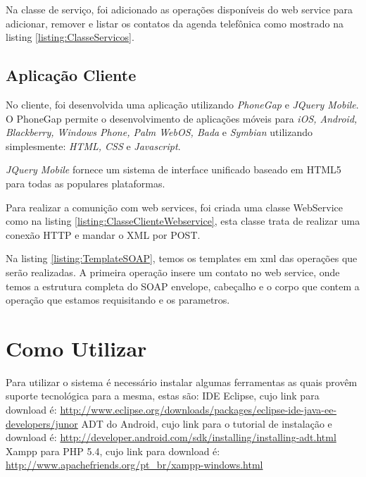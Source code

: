 \documentclass{acm_proc_article-sp}
\begin{document}
	
	
	Na classe de serviço, foi adicionado as operações disponíveis do web service para adicionar, remover e listar os contatos da agenda telefônica como mostrado na listing \ref{listing:ClasseServicos}.
	
	
	
	\subsection{Aplicação Cliente}
	
	No cliente, foi desenvolvida uma aplicação utilizando \emph{PhoneGap} e \emph{JQuery Mobile}. O PhoneGap permite o desenvolvimento de aplicações móveis para \emph{iOS, Android, Blackberry, Windows Phone, Palm WebOS, Bada} e \emph{Symbian} utilizando simplesmente: \emph{HTML, CSS} e \emph{Javascript}\cite{PHONEGAPSITE}.
	
	\emph{JQuery Mobile} fornece um sistema de interface unificado baseado em HTML5 para todas as populares plataformas.\cite{JQUERYMOBILESITE}
	
	Para realizar a comunição com web services, foi criada uma classe WebService como na listing \ref{listing:ClasseClienteWebservice}, esta classe trata de realizar uma conexão HTTP e mandar o XML por POST.
	
	
	
	Na listing \ref{listing:TemplateSOAP}, temos os templates em xml das operações que serão realizadas. A primeira operação insere um contato no web service, onde temos a estrutura completa do SOAP envelope, cabeçalho e o corpo que contem a operação que estamos requisitando e os parametros.
	
	
 
\section{Como Utilizar}
	
	Para utilizar o sistema é necessário instalar algumas ferramentas as quais provêm suporte tecnológica para a mesma, estas são:
	IDE Eclipse, cujo link para download é: \url{http://www.eclipse.org/downloads/packages/eclipse-ide-java-ee-developers/junor}
	ADT do Android, cujo link para o tutorial de instalação e download é: \url{http://developer.android.com/sdk/installing/installing-adt.html}
	Xampp para PHP 5.4, cujo link para download é: \url{ http://www.apachefriends.org/pt_br/xampp-windows.html}
	
\end{document}
